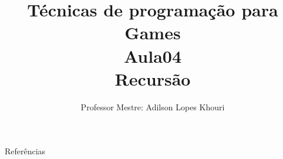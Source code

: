 \documentclass[compress, hyperref={pdfpagelayout=SinglePage}]{beamer}
\title[AED - Aula 04]{Técnicas de programação para Games \\ Aula04 \\ Recursão}
\author{Professor Mestre: Adilson Lopes Khouri}
\begin{document}
	\begin{frame}
		\titlepage
	\end{frame}

	
	
	
	

	
	
	

	


	\begin{frame}{}
		\begin{block}{Referências}
			\tiny
			\nocite{*}
			
	    		
		\end{block}
	\end{frame}
\end{document}
